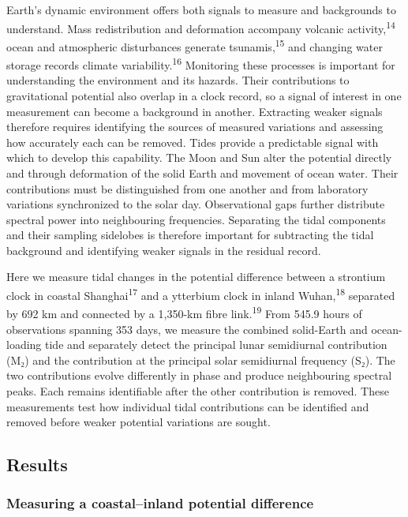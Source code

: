 \documentclass[
  11pt,
  a4paper,
]{article}
\begin{document}
Earth's dynamic environment offers both signals to measure and
backgrounds to understand. Mass redistribution and deformation accompany
volcanic activity,\textsuperscript{14} ocean and atmospheric
disturbances generate tsunamis,\textsuperscript{15} and changing water
storage records climate variability.\textsuperscript{16} Monitoring
these processes is important for understanding the environment and its
hazards. Their contributions to gravitational potential also overlap in
a clock record, so a signal of interest in one measurement can become a
background in another. Extracting weaker signals therefore requires
identifying the sources of measured variations and assessing how
accurately each can be removed. Tides provide a predictable signal with
which to develop this capability. The Moon and Sun alter the potential
directly and through deformation of the solid Earth and movement of
ocean water. Their contributions must be distinguished from one another
and from laboratory variations synchronized to the solar day.
Observational gaps further distribute spectral power into neighbouring
frequencies. Separating the tidal components and their sampling
sidelobes is therefore important for subtracting the tidal background
and identifying weaker signals in the residual record.

Here we measure tidal changes in the potential difference between a
strontium clock in coastal Shanghai\textsuperscript{17} and a ytterbium
clock in inland Wuhan,\textsuperscript{18} separated by 692 km and
connected by a 1,350-km fibre link.\textsuperscript{19} From 545.9 hours
of observations spanning 353 days, we measure the combined solid-Earth
and ocean-loading tide and separately detect the principal lunar
semidiurnal contribution (M₂) and the contribution at the principal
solar semidiurnal frequency (S₂). The two contributions evolve
differently in phase and produce neighbouring spectral peaks. Each
remains identifiable after the other contribution is removed. These
measurements test how individual tidal contributions can be identified
and removed before weaker potential variations are sought.

\hypertarget{results}{%
\subsection{Results}\label{results}}

\hypertarget{measuring-a-coastalinland-potential-difference}{%
\subsubsection{Measuring a coastal--inland potential
difference}\label{measuring-a-coastalinland-potential-difference}}
\end{document}

